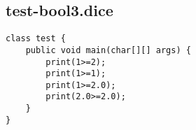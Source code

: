 \subsection{test-bool3.dice}
\begin{verbatim}
class test {
	public void main(char[][] args) {
		print(1>=2);
		print(1>=1);
		print(1>=2.0);
		print(2.0>=2.0);
	}
}
\end{verbatim}